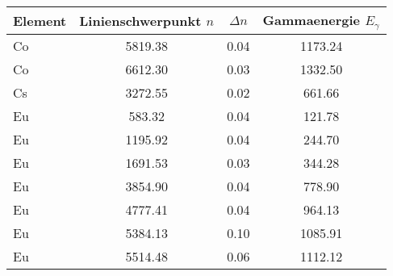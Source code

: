 \begin{tabular}{lSSS}
\toprule
Element & {Linienschwerpunkt $n$} & {$\Delta n$} & {Gammaenergie $E_{\gamma}$} \\ \midrule
Co & 5819.38 & 0.04 & 1173.24 \\
Co & 6612.30 & 0.03 & 1332.50 \\
Cs & 3272.55 & 0.02 & 661.66  \\
Eu & 583.32  & 0.04 & 121.78  \\
Eu & 1195.92 & 0.04 & 244.70  \\
Eu & 1691.53 & 0.03 & 344.28  \\
Eu & 3854.90 & 0.04 & 778.90  \\
Eu & 4777.41 & 0.04 & 964.13  \\
Eu & 5384.13 & 0.10 & 1085.91 \\
Eu & 5514.48 & 0.06 & 1112.12 \\ \bottomrule
\end{tabular}